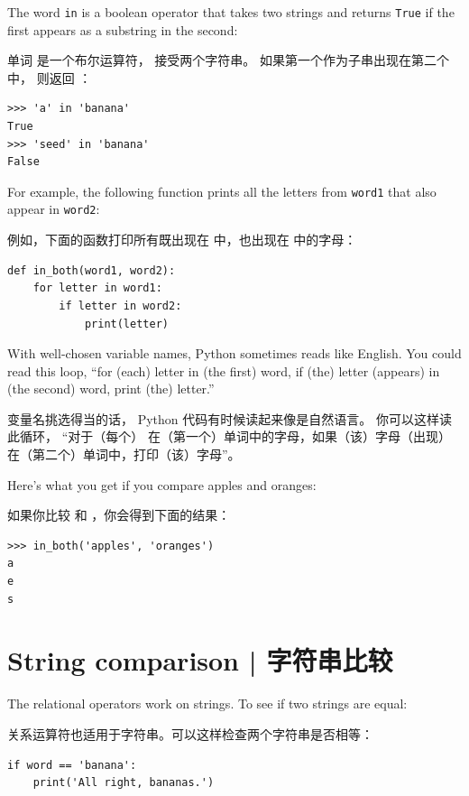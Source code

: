The word {\tt in} is a boolean operator that takes two strings and
returns {\tt True} if the first appears as a substring in the second:

单词  是一个布尔运算符， 接受两个字符串。 如果第一个作为子串出现在第二个中， 则返回 ：

\begin{lstlisting}
>>> 'a' in 'banana'
True
>>> 'seed' in 'banana'
False
\end{lstlisting}

%
For example, the following function prints all the
letters from {\tt word1} that also appear in {\tt word2}:

例如，下面的函数打印所有既出现在  中，也出现在  中的字母：

\begin{lstlisting}
def in_both(word1, word2):
    for letter in word1:
        if letter in word2:
            print(letter)
\end{lstlisting}

%
With well-chosen variable names,
Python sometimes reads like English.  You could read
this loop, ``for (each) letter in (the first) word, if (the) letter
(appears) in (the second) word, print (the) letter.''

变量名挑选得当的话， Python 代码有时候读起来像是自然语言。 你可以这样读此循环， ``对于（每个） 在（第一个）单词中的字母，如果（该）字母（出现）在（第二个）单词中，打印（该）字母''。

Here's what you get if you compare apples and oranges:

如果你比较  和 ，你会得到下面的结果：

\begin{lstlisting}
>>> in_both('apples', 'oranges')
a
e
s
\end{lstlisting}

%

\section{String comparison  |  字符串比较}
  

The relational operators work on strings.  To see if two strings are equal:

关系运算符也适用于字符串。可以这样检查两个字符串是否相等：

\begin{lstlisting}
if word == 'banana':
    print('All right, bananas.')
\end{lstlisting}

